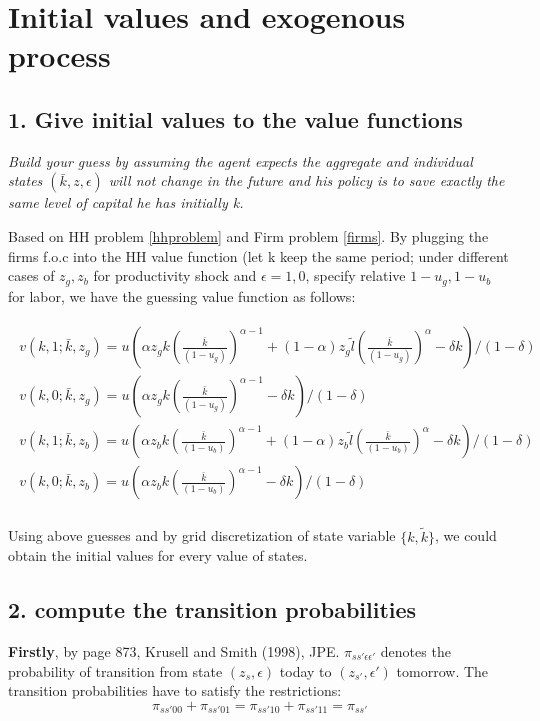 \pagebreak
\section{Initial values and exogenous process}
\subsection*{1. Give initial values to the value functions}
\textit{Build your guess by assuming the agent expects the aggregate and individual states $(\bar{k}, z, \epsilon)$ will not change in the future and his policy is to save exactly the same level of capital he has initially k.}

Based on HH problem \ref{hhproblem} and Firm problem \ref{firms}.  By plugging the firms f.o.c into the HH value function (let k keep the same period; under different cases of $z_g, z_b$ for productivity shock and $\epsilon = 1, 0 $, specify relative $1-u_g, 1-u_b$ for labor,  we have the guessing value function as follows:

 
\begin{align}
\begin{split}
v(k,1;\bar{k},z_g) = u(\alpha z_g k (\frac{\bar{k}}{(1-u_g)})^{\alpha-1} + (1-\alpha)z_g \tilde{l} (\frac{\bar{k}}{(1-u_g)})^{\alpha}  - \delta k   )   / (1-\delta) \\
v(k,0;\bar{k},z_g) = u(\alpha z_g k (\frac{\bar{k}}{(1-u_g)})^{\alpha-1} - \delta k ) / (1-\delta) \\
v(k,1;\bar{k},z_b) = u(\alpha z_b k (\frac{\bar{k}}{(1-u_b)})^{\alpha-1} + (1-\alpha)z_b \tilde{l} (\frac{\bar{k}}{(1-u_b)})^{\alpha}  - \delta k   )   / (1-\delta) \\
v(k,0;\bar{k},z_b) = u(\alpha z_b k (\frac{\bar{k}}{(1-u_b)})^{\alpha-1} - \delta k ) / (1-\delta) \\
\end{split}
\end{align}

Using above guesses and by grid discretization of state variable $\{k, \tilde{k} \}$, we could obtain the initial values for every value of states. 

\subsection*{2. compute the transition probabilities}

\textbf{Firstly}, by page 873, Krusell and Smith (1998), JPE. $\pi_{ss' \epsilon \epsilon'}$ denotes the probability of transition from state $(z_s, \epsilon)$ today to $(z_{s'}, \epsilon')$ tomorrow. The transition probabilities have to satisfy the restrictions: 
\begin{equation} \label{rule1}
\pi_{ss' 00} + \pi_{ss' 01} = \pi_{ss' 10} + \pi_{ss' 11} = \pi_{ss'}
\end{equation} 

